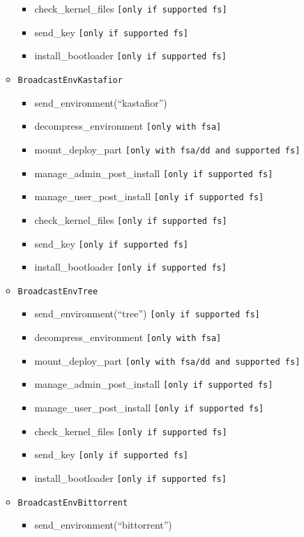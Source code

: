 \documentclass[a4wide,10pt,oneside]{book}
\begin{document}
\begin{itemize}
\begin{itemize}
\begin{itemize}
      \item check\_kernel\_files \texttt{[only if supported fs]}
      \item send\_key \texttt{[only if supported fs]}
      \item install\_bootloader \texttt{[only if supported fs]}
      \end{itemize}
    \item \texttt{BroadcastEnvKastafior}
      \begin{itemize}
      \item send\_environment(``kastafior'')
      \item decompress\_environment \texttt{[only with fsa]}
      \item mount\_deploy\_part \texttt{[only with fsa/dd and supported fs]}
      \item manage\_admin\_post\_install \texttt{[only if supported fs]}
      \item manage\_user\_post\_install \texttt{[only if supported fs]}
      \item check\_kernel\_files \texttt{[only if supported fs]}
      \item send\_key \texttt{[only if supported fs]}
      \item install\_bootloader \texttt{[only if supported fs]}
      \end{itemize}
    \item \texttt{BroadcastEnvTree}
      \begin{itemize}
      \item send\_environment(``tree'') \texttt{[only if supported fs]}
      \item decompress\_environment \texttt{[only with fsa]}
      \item mount\_deploy\_part \texttt{[only with fsa/dd and supported fs]}
      \item manage\_admin\_post\_install \texttt{[only if supported fs]}
      \item manage\_user\_post\_install \texttt{[only if supported fs]}
      \item check\_kernel\_files \texttt{[only if supported fs]}
      \item send\_key \texttt{[only if supported fs]}
      \item install\_bootloader \texttt{[only if supported fs]}
      \end{itemize}
    \item \texttt{BroadcastEnvBittorrent}
      \begin{itemize}
      \item send\_environment(``bittorrent'')

\end{itemize}
\end{itemize}
\end{itemize}
\end{document}
